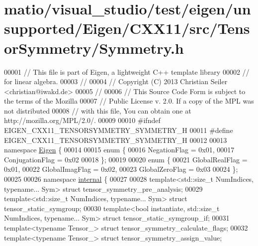 \hypertarget{matio_2visual__studio_2test_2eigen_2unsupported_2_eigen_2_c_x_x11_2src_2_tensor_symmetry_2_symmetry_8h_source}{}\section{matio/visual\+\_\+studio/test/eigen/unsupported/\+Eigen/\+C\+X\+X11/src/\+Tensor\+Symmetry/\+Symmetry.h}
\label{matio_2visual__studio_2test_2eigen_2unsupported_2_eigen_2_c_x_x11_2src_2_tensor_symmetry_2_symmetry_8h_source}

\begin{DoxyCode}
00001 \textcolor{comment}{// This file is part of Eigen, a lightweight C++ template library}
00002 \textcolor{comment}{// for linear algebra.}
00003 \textcolor{comment}{//}
00004 \textcolor{comment}{// Copyright (C) 2013 Christian Seiler <christian@iwakd.de>}
00005 \textcolor{comment}{//}
00006 \textcolor{comment}{// This Source Code Form is subject to the terms of the Mozilla}
00007 \textcolor{comment}{// Public License v. 2.0. If a copy of the MPL was not distributed}
00008 \textcolor{comment}{// with this file, You can obtain one at http://mozilla.org/MPL/2.0/.}
00009 
00010 \textcolor{preprocessor}{#ifndef EIGEN\_CXX11\_TENSORSYMMETRY\_SYMMETRY\_H}
00011 \textcolor{preprocessor}{#define EIGEN\_CXX11\_TENSORSYMMETRY\_SYMMETRY\_H}
00012 
00013 \textcolor{keyword}{namespace }\hyperlink{namespace_eigen}{Eigen} \{
00014 
00015 \textcolor{keyword}{enum} \{
00016   NegationFlag           = 0x01,
00017   ConjugationFlag        = 0x02
00018 \};
00019 
00020 \textcolor{keyword}{enum} \{
00021   GlobalRealFlag         = 0x01,
00022   GlobalImagFlag         = 0x02,
00023   GlobalZeroFlag         = 0x03
00024 \};
00025 
00026 \textcolor{keyword}{namespace }\hyperlink{namespaceinternal}{internal} \{
00027 
00028 \textcolor{keyword}{template}<std::size\_t NumIndices, \textcolor{keyword}{typename}... Sym>                   \textcolor{keyword}{struct }tensor\_symmetry\_pre\_analysis;
00029 \textcolor{keyword}{template}<std::size\_t NumIndices, \textcolor{keyword}{typename}... Sym>                   \textcolor{keyword}{struct }tensor\_static\_symgroup;
00030 \textcolor{keyword}{template}<\textcolor{keywordtype}{bool} instantiate, std::size\_t NumIndices, \textcolor{keyword}{typename}... Sym> \textcolor{keyword}{struct }tensor\_static\_symgroup\_if;
00031 \textcolor{keyword}{template}<\textcolor{keyword}{typename} Tensor\_> \textcolor{keyword}{struct }tensor\_symmetry\_calculate\_flags;
00032 \textcolor{keyword}{template}<\textcolor{keyword}{typename} Tensor\_> \textcolor{keyword}{struct }tensor\_symmetry\_assign\_value;

\end{DoxyCode}
